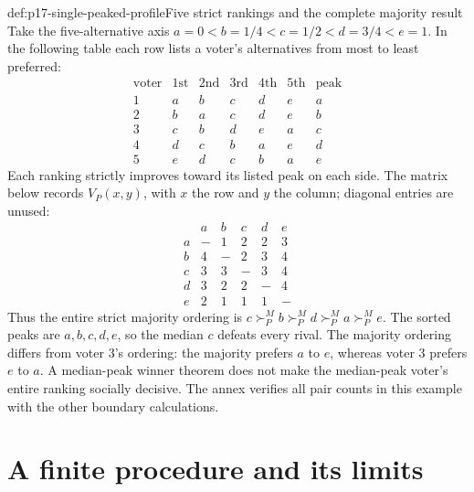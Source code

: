 \begin{hbexample}{def:p17-single-peaked-profile}{Five strict rankings and the complete majority result}
Take the five-alternative axis
\(a=0<b=1/4<c=1/2<d=3/4<e=1\). In the following table each
row lists a voter's alternatives from most to least preferred:
\[
 \begin{array}{c|ccccc|c}
 \text{voter}&1\text{st}&2\text{nd}&3\text{rd}&4\text{th}&5\text{th}&\text{peak}\\\hline
 1&a&b&c&d&e&a\\
 2&b&a&c&d&e&b\\
 3&c&b&d&e&a&c\\
 4&d&c&b&a&e&d\\
 5&e&d&c&b&a&e
 \end{array}
\]
Each ranking strictly improves toward its listed peak on each side.
The matrix below records \(V_P(x,y)\), with \(x\) the row and
\(y\) the column; diagonal entries are unused:
\[
 \begin{array}{c|ccccc}
      &a&b&c&d&e\\\hline
 a&-&1&2&2&3\\
 b&4&-&2&3&4\\
 c&3&3&-&3&4\\
 d&3&2&2&-&4\\
 e&2&1&1&1&-
 \end{array}
\]
Thus the entire strict majority ordering is
\(c\succ^M_P b\succ^M_P d\succ^M_P a\succ^M_P e\).
The sorted peaks are \(a,b,c,d,e\), so the median \(c\) defeats
every rival. The majority ordering differs from voter 3's ordering:
the majority prefers \(a\) to \(e\), whereas voter 3 prefers
\(e\) to \(a\). A median-peak winner theorem does not make the
median-peak voter's entire ranking socially decisive. The annex verifies
all pair counts in this example with the other boundary calculations.
\end{hbexample}

\section{A finite procedure and its limits}
\label{sec:p17-single-peaked-procedure}

